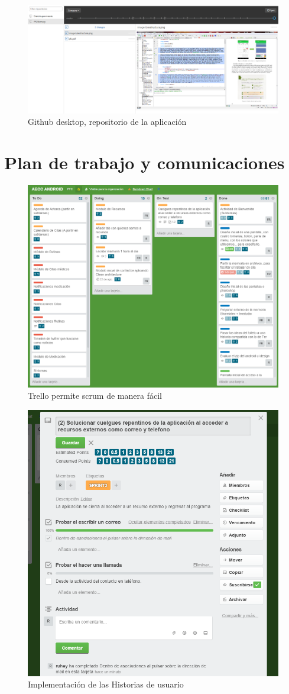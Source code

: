 \documentclass[../pfc.tex]{subfiles}
\begin{document}
	
	\begin{figure}[h]
		\centering
		\includegraphics[width=0.7\linewidth]{../images/githubdesktopmemory}
		\caption{Github desktop, repositorio de la aplicación}
		\label{fig:ghdesktopM}
	\end{figure}

	
	\section{Plan de trabajo y comunicaciones}

	
	\begin{figure}[h]
		\centering
		\includegraphics[width=0.7\linewidth]{../images/trellogeneral}
		\caption{Trello permite scrum de manera fácil}
		\label{fig:trello}
	\end{figure}

	
	\begin{figure}[h]
		\centering
		\includegraphics[width=0.7\linewidth]{../images/tarea}
		\caption{Implementación de las Historias de usuario}
		\label{fig:tareaTrello}
	\end{figure}
\end{document}
